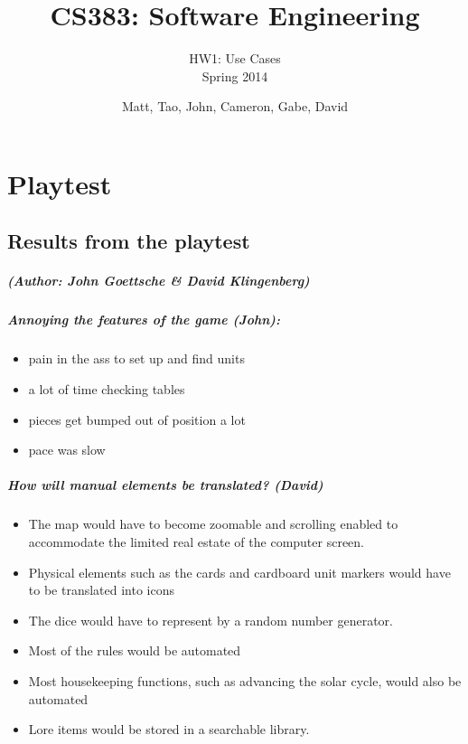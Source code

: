 \documentclass[12pt,letterpaper]{scrreprt}
\title{CS383: Software Engineering}
\subtitle{HW1: Use Cases\\Spring 2014}
\author{Matt, Tao, John, Cameron, Gabe, David} %
\date{}
\begin{document}
\maketitle
\tableofcontents %

\chapter{Playtest}
%
%
%
\section{Results from the playtest}
\paragraph{(Author: John Goettsche \& David Klingenberg)}
\paragraph{ Annoying the features of the game (John):}
	\begin{itemize}
		\item pain in the ass to set up and find units
		\item a lot of time checking tables
		\item pieces get bumped out of position a lot
		\item pace was slow
	\end{itemize}
	
\paragraph{How will manual elements be translated? (David)}
	\begin{itemize}
		\item The map would have to become zoomable and scrolling enabled to accommodate the limited real estate of the computer screen.
		\item Physical elements such as the cards and cardboard unit markers would have to be translated into icons
		\item The dice would have to represent by a random number generator. 
		\item Most of the rules would be automated
		\item Most housekeeping functions, such as advancing the solar cycle, would also be automated
		\item Lore items would be stored in a searchable library.
	\end{itemize}
\end{document}
